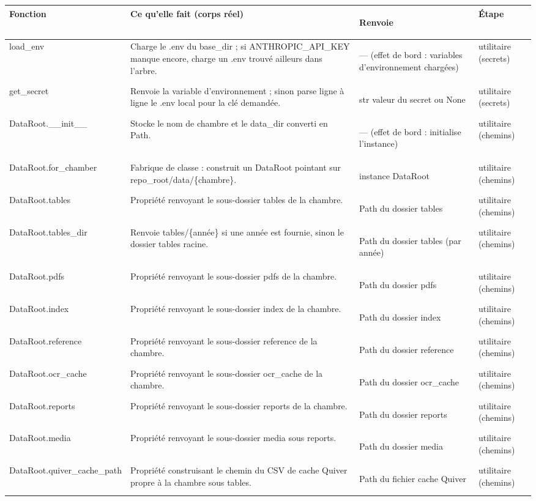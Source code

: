 \documentclass[11pt,a4paper]{article}
\makeatletter
\newenvironment{fnt}{%
  \par\footnotesize
  \setlength{\tabcolsep}{3pt}%
  \begin{longtable}{@{}>{\ttfamily\scriptsize\raggedright\arraybackslash}p{3.0cm} >{\raggedright\arraybackslash}p{7.5cm} >{\itshape\scriptsize\raggedright\arraybackslash}p{2.7cm} >{\scriptsize\raggedright\arraybackslash}p{1.85cm}@{}}
  \toprule
  \normalfont\bfseries\scriptsize Fonction & \bfseries\scriptsize Ce qu'elle fait (corps réel) &
  \normalfont\bfseries\scriptsize Renvoie & \normalfont\bfseries\scriptsize Étape\\
  \midrule\endhead
}{\bottomrule\end{longtable}\par}
\makeatother
\begin{document}
\begin{fnt}
load_\allowbreak env & Charge le .env du base_dir ; si ANTHROPIC_API_KEY manque encore,\allowbreak{} charge un .env trouvé ailleurs dans l'arbre. & — (effet de bord : variables d'environnement chargées)\allowbreak{} & utilitaire (secrets) \\
get_\allowbreak secret & Renvoie la variable d'environnement ; sinon parse ligne à ligne le .env local pour la clé demandée. & str valeur du secret ou None & utilitaire (secrets) \\
DataRoot.\allowbreak _\allowbreak _\allowbreak init_\allowbreak _\allowbreak  & Stocke le nom de chambre et le data_dir converti en Path. & — (effet de bord : initialise l'instance)\allowbreak{} & utilitaire (chemins) \\
DataRoot.\allowbreak for_\allowbreak chamber & Fabrique de classe : construit un DataRoot pointant sur repo_root/\allowbreak{}data/\allowbreak{}\{chambre\}. & instance DataRoot & utilitaire (chemins) \\
DataRoot.\allowbreak tables & Propriété renvoyant le sous-dossier tables de la chambre. & Path du dossier tables & utilitaire (chemins) \\
DataRoot.\allowbreak tables_\allowbreak dir & Renvoie tables/\allowbreak{}\{année\} si une année est fournie,\allowbreak{} sinon le dossier tables racine. & Path du dossier tables (par année)\allowbreak{} & utilitaire (chemins) \\
DataRoot.\allowbreak pdfs & Propriété renvoyant le sous-dossier pdfs de la chambre. & Path du dossier pdfs & utilitaire (chemins) \\
DataRoot.\allowbreak index & Propriété renvoyant le sous-dossier index de la chambre. & Path du dossier index & utilitaire (chemins) \\
DataRoot.\allowbreak reference & Propriété renvoyant le sous-dossier reference de la chambre. & Path du dossier reference & utilitaire (chemins) \\
DataRoot.\allowbreak ocr_\allowbreak cache & Propriété renvoyant le sous-dossier ocr_cache de la chambre. & Path du dossier ocr_cache & utilitaire (chemins) \\
DataRoot.\allowbreak reports & Propriété renvoyant le sous-dossier reports de la chambre. & Path du dossier reports & utilitaire (chemins) \\
DataRoot.\allowbreak media & Propriété renvoyant le sous-dossier media sous reports. & Path du dossier media & utilitaire (chemins) \\
DataRoot.\allowbreak quiver_\allowbreak cache_\allowbreak path & Propriété construisant le chemin du CSV de cache Quiver propre à la chambre sous tables. & Path du fichier cache Quiver & utilitaire (chemins) \\
\end{fnt}
\end{document}
